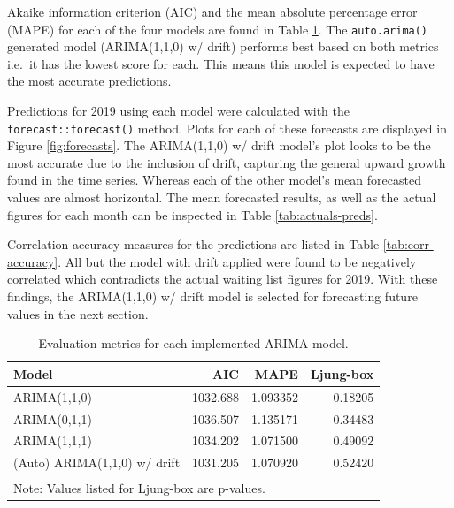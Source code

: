 \documentclass[
  12pt,
]{article}
\begin{document}
Akaike information criterion (AIC) and the mean absolute percentage error (MAPE) for each of the four models are found in Table \ref{tab:evaluation-metrics}. The \texttt{auto.arima()} generated model (ARIMA(1,1,0) w/ drift) performs best based on both metrics i.e.~it has the lowest score for each. This means this model is expected to have the most accurate predictions.

Predictions for 2019 using each model were calculated with the \texttt{forecast::forecast()} method. Plots for each of these forecasts are displayed in Figure \ref{fig:forecasts}. The ARIMA(1,1,0) w/ drift model's plot looks to be the most accurate due to the inclusion of drift, capturing the general upward growth found in the time series. Whereas each of the other model's mean forecasted values are almost horizontal. The mean forecasted results, as well as the actual figures for each month can be inspected in Table \ref{tab:actuals-preds}.

Correlation accuracy measures for the predictions are listed in Table \ref{tab:corr-accuracy}. All but the model with drift applied were found to be negatively correlated which contradicts the actual waiting list figures for 2019. With these findings, the ARIMA(1,1,0) w/ drift model is selected for forecasting future values in the next section.

\begin{table}

\caption{\label{tab:evaluation-metrics}Evaluation metrics for each implemented ARIMA model.}
\centering
\begin{tabular}[t]{lrrr}
\toprule
Model & AIC & MAPE & Ljung-box\\
\midrule
ARIMA(1,1,0) & 1032.688 & 1.093352 & 0.18205\\
ARIMA(0,1,1) & 1036.507 & 1.135171 & 0.34483\\
ARIMA(1,1,1) & 1034.202 & 1.071500 & 0.49092\\
(Auto) ARIMA(1,1,0) w/ drift & 1031.205 & 1.070920 & 0.52420\\
\bottomrule
\multicolumn{4}{l}{\textsuperscript{} Note: Values listed for Ljung-box are p-values.}\\
\end{tabular}
\end{table}
\end{document}
